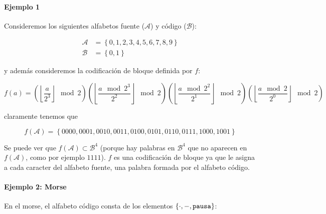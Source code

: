 \paragraph{Ejemplo 1}\label{ejemplo-1-codigos}

Consideremos los siguientes alfabetos fuente (\(\mathcal{A}\)) y código
(\(\mathcal{B}\)):


\begin{align*}
\mathcal{A} &=\left\{0,1,2,3,4,5,6,7,8,9\right\}\\
\mathcal{B} &=\left\{0,1\right\}
\end{align*}


y además consideremos la codificación de bloque definida por \(f\):

\[
f(a) = \left(\left\lfloor\frac{a}{2^3}\right\rfloor\mod 2\right)\left(\left\lfloor\frac{a \mod 2^3}{2^2}\right\rfloor\mod 2\right)\left(\left\lfloor\frac{a \mod 2^2}{2^1}\right\rfloor\mod 2\right)\left(\left\lfloor\frac{a \mod 2}{2^0}\right\rfloor\mod 2\right)
\]

claramente tenemos que

\[
f(\mathcal{A}) = \left\{0000, 0001, 0010, 0011, 0100, 0101, 0110, 0111, 1000, 1001\right\}
\]

Se puede ver que \(f(\mathcal{A})\subset\mathcal{B}^4\) (porque hay
palabras en \(\mathcal{B}^4\) que no aparecen en \(f(\mathcal{A})\),
como por ejemplo \(1111\)). \(f\) es una codificación de bloque ya que
le asigna a cada caracter del alfabeto fuente, una palabra formada por
el alfabeto código.

\paragraph{Ejemplo 2: Morse}\label{ejemplo-2-morse}

En el morse, el alfabeto código consta de los elementos
\(\left\{\cdot,-,\text{\texttt{pausa}}\right\}\):

